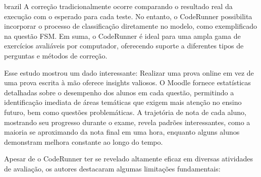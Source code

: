 \begin{otherlanguage*}{brazil}
A correção tradicionalmente ocorre comparando o resultado real da execução com o esperado para cada teste. No entanto, o CodeRunner possibilita incorporar o processo de classificação diretamente no modelo, como exemplificado na questão FSM. Em suma, o CodeRunner é ideal para uma ampla gama de exercícios avaliáveis por computador, oferecendo suporte a diferentes tipos de perguntas e métodos de correção.

Esse estudo mostrou um dado interessante: Realizar uma prova online em vez de uma prova escrita à mão oferece insights valiosos. O Moodle fornece estatísticas detalhadas sobre o desempenho dos alunos em cada questão, permitindo a identificação imediata de áreas temáticas que exigem mais atenção no ensino futuro, bem como questões problemáticas. A trajetória de nota de cada aluno, mostrando seu progresso durante o exame, revela padrões interessantes, como a maioria se aproximando da nota final em uma hora, enquanto alguns alunos demonstram melhora constante ao longo do tempo.

Apesar de o CodeRunner ter se revelado altamente eficaz em diversas atividades de avaliação, os autores destacaram algumas limitações fundamentais:


\end{otherlanguage*}
